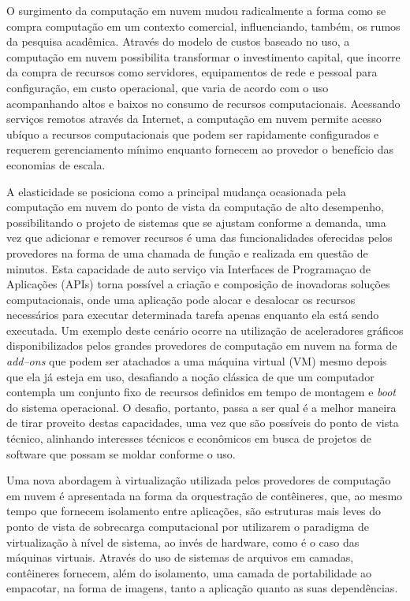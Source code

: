 \documentclass[english,brazilian]{UNISINOSmonografia} %
\begin{document}
O surgimento da computação em nuvem mudou radicalmente a forma como se compra computação em um contexto comercial, influenciando, também, os rumos da pesquisa acadêmica.
Através do modelo de custos baseado no uso, a computação em nuvem possibilita transformar o investimento capital, que incorre da compra de recursos como servidores, equipamentos de rede e pessoal para configuração, em custo operacional, que varia de acordo com o uso acompanhando altos e baixos no consumo de recursos computacionais.
Acessando serviços remotos através da Internet, a computação em nuvem permite acesso ubíquo a recursos computacionais que podem ser rapidamente configurados e requerem gerenciamento mínimo enquanto fornecem ao provedor o benefício das economias de escala.


A elasticidade se posiciona como a principal mudança ocasionada pela computação em nuvem do ponto de vista da computação de alto desempenho, possibilitando o projeto de sistemas que se ajustam conforme a demanda, uma vez que adicionar e remover recursos é uma das funcionalidades oferecidas pelos provedores na forma de uma chamada de função e realizada em questão de minutos.
Esta capacidade de auto serviço via Interfaces de Programaçao de Aplicações (APIs) torna possível a criação e composição de inovadoras soluções computacionais, onde uma aplicação pode alocar e desalocar os recursos necessários para executar determinada tarefa apenas enquanto ela está sendo executada.
Um exemplo deste cenário ocorre na utilização de aceleradores gráficos disponibilizados pelos grandes provedores de computação em nuvem na forma de \textit{add--ons} que podem ser atachados a uma máquina virtual (VM) mesmo depois que ela já esteja em uso, desafiando a noção clássica de que um computador contempla um conjunto fixo de recursos definidos em tempo de montagem e \textit{boot} do sistema operacional.
O desafio, portanto, passa a ser qual é a melhor maneira de tirar proveito destas capacidades, uma vez que são possíveis do ponto de vista técnico, alinhando interesses técnicos e econômicos em busca de projetos de software que possam se moldar conforme o uso.


Uma nova abordagem à virtualização utilizada pelos provedores de computação em nuvem é apresentada na forma da orquestração de contêineres, que, ao mesmo tempo que fornecem isolamento entre aplicações, são estruturas mais leves do ponto de vista de sobrecarga computacional por utilizarem o paradigma de virtualização à nível de sistema, ao invés de hardware, como é o caso das máquinas virtuais.
Através do uso de sistemas de arquivos em camadas, contêineres fornecem, além do isolamento, uma camada de portabilidade ao empacotar, na forma de imagens, tanto a aplicação quanto as suas dependências.
\end{document}
